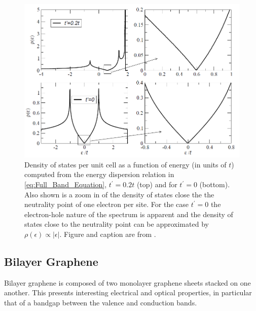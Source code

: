 \documentclass[]{article}
\begin{document}
\begin{figure}[htb]
	\centering
	\includegraphics[scale = 0.6]{monolayer_DOS.PNG}
	\caption{Density of states per unit cell as a function of energy (in units of $t$) computed from the energy dispersion relation in \ref{eq:Full_Band_Equation}, $t^{'} = 0.2t$ (top) and for  $t^{'} = 0$ (bottom). Also shown is a zoom in of the density of states close the the neutrality point of one electron per site. For the case  $t^{'} = 0$ the electron-hole nature of the spectrum is apparent and the density of states close to the neutrality point can be approximated by $\rho(\epsilon) \propto |\epsilon|$. Figure and caption are from \cite{The_Electronic_Properties_of_Graphene}. }
	\label{fig: Monolayer_graphene_dos}
\end{figure}


\subsection{Bilayer Graphene}\label{sec: bilayer_graphene}
Bilayer graphene is composed of two monolayer graphene sheets stacked on one another. This presents interesting electrical and optical properties, in particular that of a bandgap between the valence and conduction bands.
\newline
\end{document}
